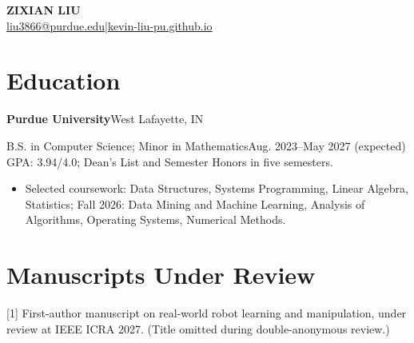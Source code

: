 \documentclass[10pt,letterpaper]{article}
\newcommand{\entry}[2]{\textbf{#1}\hfill #2\par}
\begin{document}
\begin{center}
{\LARGE\bfseries ZIXIAN LIU}\\[4pt]
\href{mailto:liu3866@purdue.edu}{liu3866@purdue.edu}\quad|\quad\href{https://kevin-liu-pu.github.io}{kevin-liu-pu.github.io}
\end{center}\vspace{-7pt}
\section{Education}
\entry{Purdue University}{West Lafayette, IN}
B.S. in Computer Science; Minor in Mathematics\hfill Aug. 2023--May 2027 (expected)\\
GPA: 3.94/4.0; Dean's List and Semester Honors in five semesters.
\begin{itemize}
\item Selected coursework: Data Structures, Systems Programming, Linear Algebra, Statistics; Fall 2026: Data Mining and Machine Learning, Analysis of Algorithms, Operating Systems, Numerical Methods.
\end{itemize}
\section{Manuscripts Under Review}
[1] First-author manuscript on real-world robot learning and manipulation, under review at IEEE ICRA 2027. (Title omitted during double-anonymous review.)
\end{document}
